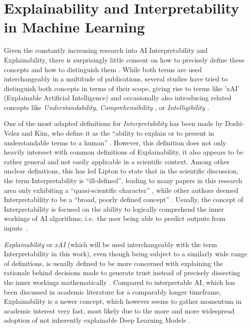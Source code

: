 
\section{Explainability and Interpretability in Machine Learning}\label{sec:explainability}

Given the constantly increasing research into AI Interpretability and Explainability, there is surprisingly little consent on how to precisely define these concepts and how to distinguish them \parencite{Linardatos2021}. 
While both terms are used interchangeably in a multitude of publications, several studies have tried to distinguish both concepts in terms of their scope, giving rise to terms like 'xAI' (Explainable Artificial Intelligence) \parencite{Gunning2019} and occasionally also introducing related concepts like \textit{Understandability}, \textit{Comprehensibility} \parencite{Guidotti2018}, or \textit{Intelligibility} \parencite{Caruana2015}.


One of the most adapted definitions for \textit{Interpretability} has been made by Doshi-Velez and Kim, who define it as the “ability to explain or to present in understandable terms to a human” \parencite{DoshiVelez2017}. 
However, this definition does not only heavily intersect with common definitions of Explainability, it also appears to be rather general and not easily applicable in a scientific context. 
Among other unclear definitions, this has led Lipton to state that in the scientific discussion, the term Interpretability is “ill-defined”, leading to many papers in this research area only exhibiting a “quasi-scientific character” \parencite{Lipton2018}, while other authors deemed Interpretability to be a “broad, poorly defined concept” \parencite{Murdoch2019}. 
Usually, the concept of Interpretability is focused on the ability to logically comprehend the inner workings of AI algorithms, i.e.\ the user being able to predict outputs from inputs~\parencite{Kim2016}.


\textit{Explainability} or \textit{xAI} (which will be used interchangeably with the term Interpretability in this work), even though being subject to a similarly wide range of definitions, is usually defined to be more concerned with explaining the rationale behind decisions made to generate trust instead of precisely dissecting the inner workings mathematically \parencite{Gunning2019}. 
Compared to interpretable AI, which has been discussed in academic literature for a comparably longer timeframe, Explainability is a newer concept, which however seems to gather momentum in academic interest very fast, most likely due to the more and more widespread adoption of not inherently explainable Deep Learning Models \parencite{BarredoArrieta2020}.


